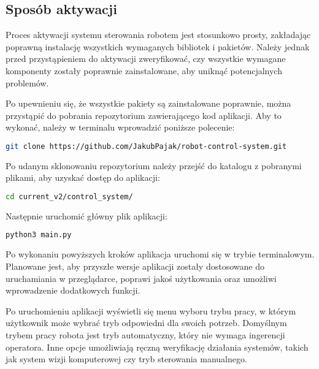 \subsection{Sposób aktywacji}
\label{sek:aktywacja}

Proces aktywacji systemu sterowania robotem jest stosunkowo prosty, zakładając poprawną instalację wszystkich wymaganych bibliotek i pakietów. Należy jednak przed przystąpieniem do aktywacji zweryfikować, czy wszystkie wymagane komponenty zostały poprawnie zainstalowane, aby uniknąć potencjalnych problemów.

Po upewnieniu się, że wszystkie pakiety są zainstalowane poprawnie, można przystąpić do pobrania repozytorium zawierającego kod aplikacji. Aby to wykonać, należy w terminalu wprowadzić poniższe polecenie:

\begin{lstlisting}[language=bash]
    git clone https://github.com/JakubPajak/robot-control-system.git
\end{lstlisting}

Po udanym sklonowaniu repozytorium należy przejść do katalogu z pobranymi plikami, aby uzyskać dostęp do aplikacji:

\begin{lstlisting}[language=bash]
    cd current_v2/control_system/
\end{lstlisting}

Następnie uruchomić główny plik aplikacji:

\begin{lstlisting}[language=bash]
    python3 main.py
\end{lstlisting}

Po wykonaniu powyższych kroków aplikacja uruchomi się w trybie terminalowym. Planowane jest, aby przyszłe wersje aplikacji zostały dostosowane do uruchamiania w przeglądarce, poprawi jakoś użytkowania oraz umożliwi wprowadzenie dodatkowych funkcji.

Po uruchomieniu aplikacji wyświetli się menu wyboru trybu pracy, w którym użytkownik może wybrać tryb odpowiedni dla swoich potrzeb. Domyślnym trybem pracy robota jest tryb automatyczny, który nie wymaga ingerencji operatora. Inne opcje umożliwiają ręczną weryfikację działania systemów, takich jak system wizji komputerowej czy tryb sterowania manualnego.


